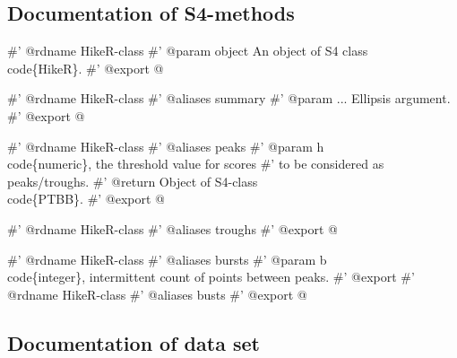 \documentclass[a4paper]{article}
\begin{document}
\subsection{Documentation of S4-methods}

\nwenddocs{}\endmoddef
#' @rdname HikeR-class
#' @param object An object of S4 class \\code\{HikeR\}.
#' @export
\nwendcode{}@

\nwenddocs{}\endmoddef
#' @rdname HikeR-class
#' @aliases summary
#' @param ... Ellipsis argument.
#' @export
\nwendcode{}@

\nwenddocs{}\endmoddef
#' @rdname HikeR-class
#' @aliases peaks
#' @param h \\code\{numeric\}, the threshold value for scores
#' to be considered as peaks/troughs.
#' @return Object of S4-class \\code\{PTBB\}.
#' @export
\nwendcode{}@

\nwenddocs{}\endmoddef
#' @rdname HikeR-class
#' @aliases troughs
#' @export
\nwendcode{}@

\nwenddocs{}\endmoddef
#' @rdname HikeR-class
#' @aliases bursts
#' @param b \\code\{integer\}, intermittent count of points between peaks.
#' @export
#' @rdname HikeR-class
#' @aliases busts
#' @export
\nwendcode{}@


\subsection{Documentation of data set}
\end{document}
